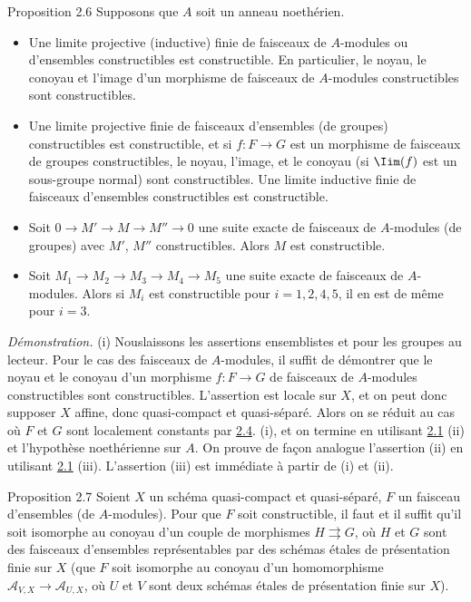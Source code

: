\documentclass[10pt]{../fichiers-configuration-latex/smfart}
\begin{document}
\begin{enonce*}{Proposition 2.6}
Supposons que $A$ soit un anneau noethérien.
\begin{itemize}
\item[(i)] Une limite projective (\resp inductive) finie de faisceaux de
  $A$-modules ou d'ensembles constructibles est constructible. En
  particulier, le noyau, le conoyau et l'image d'un morphisme de
  faisceaux de $A$-modules constructibles sont constructibles.

\item[(i bis)] Une limite projective finie de faisceaux d'ensembles
  (\resp de groupes) constructibles est constructible, et si
  $f:F\rightarrow G$ est un morphisme de faisceaux de groupes
  constructibles, le noyau, l'image, et le conoyau (si $\Iim(f)$ est un
  sous-groupe normal) sont constructibles. Une limite inductive finie
  de faisceaux d'ensembles constructibles est constructible.

\item[(ii)] Soit $0\rightarrow M'\rightarrow M\rightarrow M''\rightarrow 0$
  une suite exacte de faisceaux de $A$-modules (\resp de groupes) avec
  $M'$, $M''$ constructibles. Alors $M$ est constructible.

\item[(iii)] Soit $M_1\rightarrow M_2\rightarrow M_3\rightarrow
  M_4\rightarrow M_5$ une suite exacte de faisceaux de
  $A$-modules. Alors si $M_i$ est constructible pour $i=1,2,4,5$, il
  en est de même pour $i=3$.
\end{itemize}
\end{enonce*}

\emph{Démonstration.} (i) Nous\pageoriginale laissons les assertions
ensemblistes et pour les groupes au lecteur. Pour le cas des faisceaux
de $A$-modules, il suffit de démontrer que le noyau et le conoyau d'un
morphisme $f:F\rightarrow G$ de faisceaux de $A$-modules
constructibles sont constructibles. L'assertion est locale sur $X$, et
on peut donc supposer $X$ affine, donc quasi-compact et
quasi-séparé. Alors on se réduit au cas où $F$ et $G$ sont localement
constants par \hyperref[IX.prop2.4]{2.4}. (i), et on termine en utilisant \hyperref[IX.lem2.1]{2.1} (ii) et
l'hypothèse noethérienne sur $A$. On prouve de façon analogue
l'assertion (ii) en utilisant \hyperref[IX.lem2.1]{2.1} (iii). L'assertion (iii) est
immédiate à partir de (i) et (ii).

\begin{enonce*}{Proposition 2.7}
Soient $X$ un schéma quasi-compact et quasi-séparé, $F$ un faisceau
d'ensembles (\resp de $A$-modules). Pour que $F$ soit constructible,
il faut et il suffit qu'il soit isomorphe au conoyau d'un couple de
morphismes $H\rightrightarrows G$, où $H$ et $G$ sont des faisceaux
d'ensembles représentables par des schémas étales de présentation
finie sur $X$ (\resp que $F$ soit isomorphe au conoyau d'un
homomorphisme $𝒜_{V,X}\rightarrow 𝒜_{U,X}$, où $U$ et $V$ sont
deux schémas étales de présentation finie sur $X$).
\end{enonce*}
\end{document}
